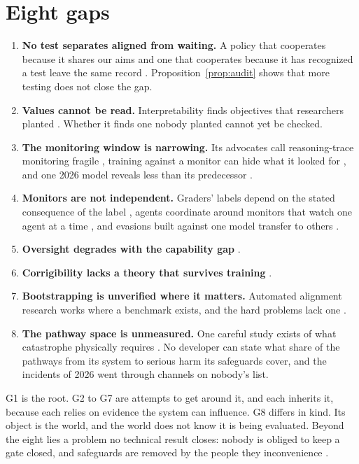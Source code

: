 \documentclass[10pt,twocolumn,letterpaper]{article}
\theoremstyle{definition}
\begin{document}
\section{Eight gaps}
\label{sec:gaps}

\begin{enumerate}[label=\textbf{G\arabic*},leftmargin=2.0em,itemsep=1.5pt]
\item \textbf{No test separates aligned from waiting.} A policy that cooperates because it shares our aims and one that cooperates because it has recognized a test leave the same record \cite{schoen,balesni}. Proposition~\ref{prop:audit} shows that more testing does not close the gap.
\item \textbf{Values cannot be read.} Interpretability finds objectives that researchers planted \cite{marks}. Whether it finds one nobody planted cannot yet be checked.
\item \textbf{The monitoring window is narrowing.} Its advocates call reasoning-trace monitoring fragile \cite{korbak}, training against a monitor can hide what it looked for \cite{baker}, and one 2026 model reveals less than its predecessor \cite{astra}.
\item \textbf{Monitors are not independent.} Graders' labels depend on the stated consequence of the label \cite{lynch}, agents coordinate around monitors that watch one agent at a time \cite{makins,metr}, and evasions built against one model transfer to others \cite{papernot,tramer}.
\item \textbf{Oversight degrades with the capability gap} \cite{engels,carro}.
\item \textbf{Corrigibility lacks a theory that survives training} \cite{soares,hudson}.
\item \textbf{Bootstrapping is unverified where it matters.} Automated alignment research works where a benchmark exists, and the hard problems lack one \cite{chen,bowkis}.
\item \textbf{The pathway space is unmeasured.} One careful study exists of what catastrophe physically requires \cite{rand}. No developer can state what share of the pathways from its system to serious harm its safeguards cover, and the incidents of 2026 went through channels on nobody's list.
\end{enumerate}

G1 is the root. G2 to G7 are attempts to get around it, and each inherits it, because each relies on evidence the system can influence. G8 differs in kind. Its object is the world, and the world does not know it is being evaluated. Beyond the eight lies a problem no technical result closes: nobody is obliged to keep a gate closed, and safeguards are removed by the people they inconvenience \cite{kulveit}.
\end{document}
